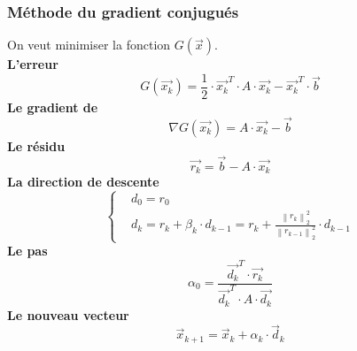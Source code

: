 \subsubsection*{Méthode du gradient conjugués}
\noindent
On veut minimiser la fonction $G(\overrightarrow{x})$.\\
\textbf{L'erreur}
\begin{equation}
    G(\overrightarrow{x_k})=\frac{1}{2}\cdot \overrightarrow{x_k}^T\cdot A\cdot \overrightarrow{x_k}-\overrightarrow{x_k}^T\cdot \overrightarrow{b}
    \nonumber
\end{equation}
\textbf{Le gradient de }
\begin{equation}
    \nabla G(\overrightarrow{x_k})=A\cdot \overrightarrow{x_k}-\overrightarrow{b}
    \nonumber
\end{equation}
\textbf{Le résidu}
\begin{equation}
    \overrightarrow{r_k}=\overrightarrow{b}-A\cdot \overrightarrow{x_k}
    \nonumber
\end{equation}
\textbf{La direction de descente}
\begin{equation}
    \left\{\begin{aligned}
         & d_0=r_0                                                                                                           \\
         & d_k = r_k+\beta_k\cdot d_{k-1}=r_k+\frac{\left \| r_k \right \|_2^2}{\left \| r_{k-1} \right \|_2^2}\cdot d_{k-1}
    \end{aligned}\right.
    \nonumber
\end{equation}
\textbf{Le pas}
\begin{equation}
    \alpha_0=\frac{\overrightarrow{d_k}^T\cdot \overrightarrow{r_k}}{\overrightarrow{d_k}^T\cdot A\cdot \overrightarrow{d_k}}
    \nonumber
\end{equation}
\textbf{Le nouveau vecteur}
\begin{equation}
    \overrightarrow{x}_{k+1}=\overrightarrow{x}_{k}+\alpha_k\cdot \overrightarrow{d}_k
    \nonumber
\end{equation}


